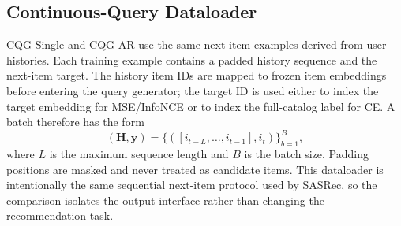 \documentclass[letterpaper]{article}
\begin{document}
\begin{table}[H]
\centering
\small
{}
\caption{Training hyperparameters for the three datasets. ``Hidden'' is the Transformer width; all continuous queries remain 64-dimensional. SASRec uses at most 200 epochs on ML-1M/Beauty and 400 on Sports. Sequence length is 50 for ML-1M and 20 for Beauty/Sports; ``max.'' denotes early-stopped training.}
\label{tab:hparams}
\end{table}

\subsection{Continuous-Query Dataloader}
\label{app:cqg_dataloader}

CQG-Single and CQG-AR use the same next-item examples derived from user histories. Each training example contains a padded history sequence and the next-item target. The history item IDs are mapped to frozen item embeddings before entering the query generator; the target ID is used either to index the target embedding for MSE/InfoNCE or to index the full-catalog label for CE. A batch therefore has the form
\[
(\mathbf{H}, \mathbf{y}) =
\{([i_{t-L},\ldots,i_{t-1}], i_t)\}_{b=1}^{B},
\]
where $L$ is the maximum sequence length and $B$ is the batch size. Padding positions are masked and never treated as candidate items. This dataloader is intentionally the same sequential next-item protocol used by SASRec, so the comparison isolates the output interface rather than changing the recommendation task.
\end{document}

